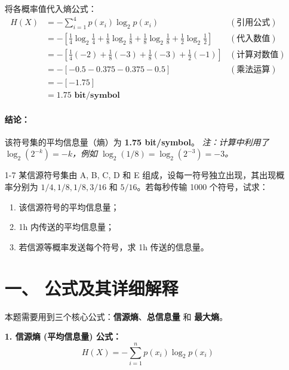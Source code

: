 \documentclass[a4paper,11pt]{ctexart}
\begin{document}
\begin{enumerate}[label=\textbf{1-\arabic*}]
    将各概率值代入熵公式：
    \begin{align*}
        H(X) &= -\sum_{i=1}^{4} p(x_i) \log_2 p(x_i) & (\text{引用公式}) \\
             &= -\left[ \frac{1}{4}\log_2\frac{1}{4} + \frac{1}{8}\log_2\frac{1}{8} + \frac{1}{8}\log_2\frac{1}{8} + \frac{1}{2}\log_2\frac{1}{2} \right] & (\text{代入数值}) \\
             &= -\left[ \frac{1}{4}(-2) + \frac{1}{8}(-3) + \frac{1}{8}(-3) + \frac{1}{2}(-1) \right] & (\text{计算对数值}) \\
             &= -\left[ -0.5 - 0.375 - 0.375 - 0.5 \right] & (\text{乘法运算}) \\
             &= - [ -1.75 ] \\
             &= \mathbf{1.75 \text{ bit/symbol}}
    \end{align*}
    
    \paragraph{结论：}
    该符号集的平均信息量（熵）为 \textbf{1.75 bit/symbol}。
    \newline
    \textit{注：计算中利用了 $\log_2(2^{-k}) = -k$，例如 $\log_2(1/8) = \log_2(2^{-3}) = -3$。}


    \item[1-7] 某信源符号集由 A, B, C, D 和 E 组成，设每一符号独立出现，其出现概率分别为 $1/4, 1/8, 1/8, 3/16$ 和 $5/16$。若每秒传输 1000 个符号，试求：
    \begin{enumerate}
        \item 该信源符号的平均信息量；
        \item 1h 内传送的平均信息量；
        \item 若信源等概率发送每个符号，求 1h 传送的信息量。
    \end{enumerate}
\begin{tcolorbox}[colback=white, colframe=blue!50!black, title=\textbf{题目解答：1-7 信源熵与传输信息量的计算}]

    \section*{一、 公式及其详细解释}
    
    本题需要用到三个核心公式：\textbf{信源熵}、\textbf{总信息量} 和 \textbf{最大熵}。
    
    \textbf{1. 信源熵 (平均信息量) 公式：}
    \begin{equation}
        H(X) = -\sum_{i=1}^{n} p(x_i) \log_2 p(x_i)
    \end{equation}
    

\end{tcolorbox}
\end{enumerate}
\end{document}
